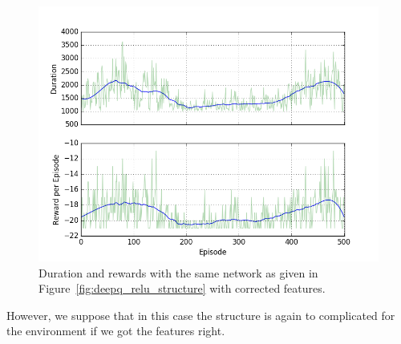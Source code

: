 \documentclass[10pt,a4paper]{article}
\begin{document}
\begin{figure}[!ht]
  \centering
  \includegraphics[width=1\textwidth]{./figures/relu_corrected.png}
  \caption{Duration and rewards with the same network as given in Figure~\ref{fig:deepq_relu_structure} with corrected features.}
  \label{fig:deep_corrected}
\end{figure}

However, we suppose that in this case the structure is again to complicated for the environment if we got the features right.
\end{document}
